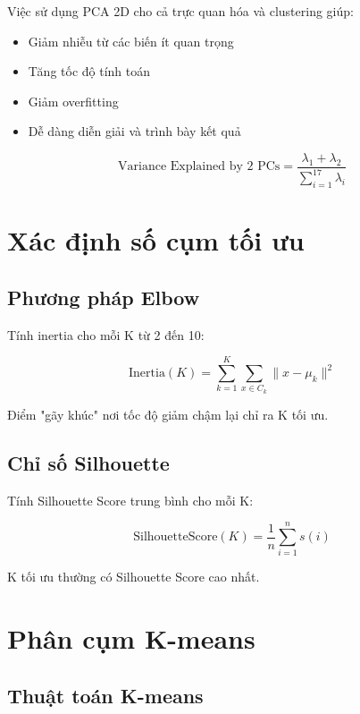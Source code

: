 Việc sử dụng PCA 2D cho cả trực quan hóa và clustering giúp:
\begin{itemize}
    \item Giảm nhiễu từ các biến ít quan trọng
    \item Tăng tốc độ tính toán
    \item Giảm overfitting
    \item Dễ dàng diễn giải và trình bày kết quả
\end{itemize}

\begin{equation}
\text{Variance Explained by 2 PCs} = \frac{\lambda_1 + \lambda_2}{\sum_{i=1}^{17} \lambda_i}
\end{equation}

\section{Xác định số cụm tối ưu}

\subsection{Phương pháp Elbow}

Tính inertia cho mỗi K từ 2 đến 10:

\begin{equation}
\text{Inertia}(K) = \sum_{k=1}^{K} \sum_{x \in C_k} \|x - \mu_k\|^2
\end{equation}

Điểm "gãy khúc" nơi tốc độ giảm chậm lại chỉ ra K tối ưu.

\subsection{Chỉ số Silhouette}

Tính Silhouette Score trung bình cho mỗi K:

\begin{equation}
\text{SilhouetteScore}(K) = \frac{1}{n} \sum_{i=1}^{n} s(i)
\end{equation}

K tối ưu thường có Silhouette Score cao nhất.

\section{Phân cụm K-means}

\subsection{Thuật toán K-means}

